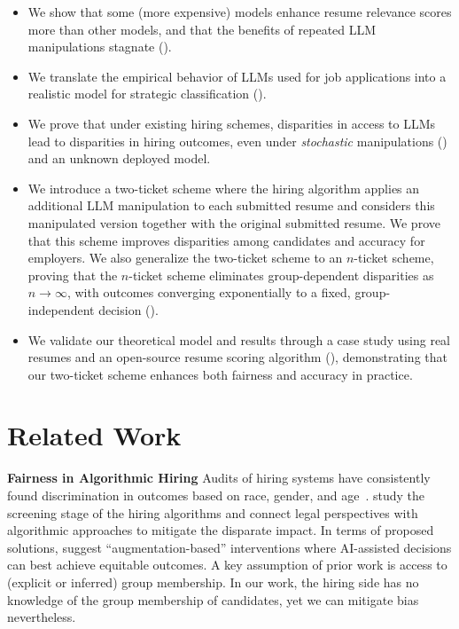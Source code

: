    \begin{itemize}
        \item We show that some (more expensive) models enhance resume relevance scores more than other models, and that the benefits of repeated LLM manipulations stagnate ().
        \item We translate the empirical behavior of LLMs used for job applications into a realistic model for strategic classification %
        ().  
        \item  
        We prove that under existing hiring schemes, disparities in access to LLMs lead to disparities in hiring outcomes, even under \textit{stochastic} manipulations () and an unknown deployed model.
        
        \item We introduce a two-ticket scheme where the hiring algorithm applies an additional LLM manipulation to each submitted resume and considers this manipulated version together with the original submitted resume. We prove that this scheme improves disparities among candidates and accuracy for employers. We also generalize the two-ticket scheme to an $n$-ticket scheme, proving that the $n$-ticket scheme eliminates group-dependent disparities as $n\rightarrow \infty$, with outcomes converging exponentially to a fixed, group-independent decision  ().
        
        \item We validate our theoretical model and results through a case study using real resumes and an open-source resume scoring algorithm (), demonstrating that our two-ticket scheme enhances both fairness and accuracy in practice.
    \end{itemize}
    

\section{Related Work} \label{sec: related work}

\textbf{Fairness in Algorithmic Hiring} Audits of hiring systems have consistently found discrimination in outcomes based on race, gender, and age~\citep{bertrand2004emily, kline2022systemic}.  \citet{raghavan2020mitigating} study the screening stage of the hiring algorithms and connect legal perspectives with algorithmic approaches to mitigate the disparate impact. 
In terms of proposed solutions, \citep{lin2021engineering} suggest ``augmentation-based'' interventions where AI-assisted decisions can best achieve equitable outcomes. A key assumption of prior work is access to (explicit or inferred) group membership. In our work, the hiring side has no knowledge of the group membership of candidates, yet we can mitigate bias nevertheless.  

